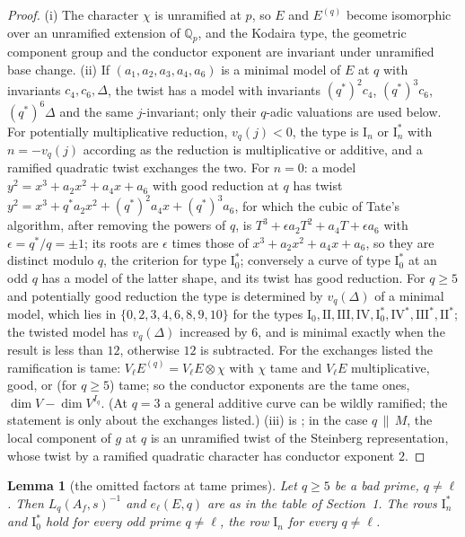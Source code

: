 \documentclass[11pt]{amsart}
\newtheorem{lemma}[theorem]{Lemma}
\theoremstyle{definition}
\newcommand{\Q}{\mathbb{Q}}
\begin{document}
\begin{proof}
(i) The character $\chi$ is unramified at $p$, so $E$ and $E^{(q)}$ become isomorphic over an unramified extension of $\Q_p$, and the Kodaira type, the geometric component group and the conductor exponent are invariant under unramified base change. (ii) If $(a_1,a_2,a_3,a_4,a_6)$ is a minimal model of $E$ at $q$ with invariants $c_4,c_6,\Delta$, the twist has a model with invariants $(q^*)^{2}c_4$, $(q^*)^{3}c_6$, $(q^*)^{6}\Delta$ and the same $j$-invariant; only their $q$-adic valuations are used below. For potentially multiplicative reduction, $v_q(j)<0$, the type is $\mathrm{I}_n$ or $\mathrm{I}_n^*$ with $n=-v_q(j)$ according as the reduction is multiplicative or additive, and a ramified quadratic twist exchanges the two. For $n=0$: a model $y^2=x^3+a_2x^2+a_4x+a_6$ with good reduction at $q$ has twist $y^2=x^3+q^*a_2x^2+(q^*)^2a_4x+(q^*)^3a_6$, for which the cubic of Tate's algorithm, after removing the powers of $q$, is $T^3+\epsilon a_2T^2+a_4T+\epsilon a_6$ with $\epsilon=q^*/q=\pm1$; its roots are $\epsilon$ times those of $x^3+a_2x^2+a_4x+a_6$, so they are distinct modulo $q$, the criterion for type $\mathrm{I}_0^*$; conversely a curve of type $\mathrm{I}_0^*$ at an odd $q$ has a model of the latter shape, and its twist has good reduction. For $q\ge5$ and potentially good reduction the type is determined by $v_q(\Delta)$ of a minimal model, which lies in $\{0,2,3,4,6,8,9,10\}$ for the types $\mathrm{I}_0,\mathrm{II},\mathrm{III},\mathrm{IV},\mathrm{I}_0^*,\mathrm{IV}^*,\mathrm{III}^*,\mathrm{II}^*$; the twisted model has $v_q(\Delta)$ increased by $6$, and is minimal exactly when the result is less than $12$, otherwise $12$ is subtracted. For the exchanges listed the ramification is tame: $V_\ell E^{(q)}=V_\ell E\otimes\chi$ with $\chi$ tame and $V_\ell E$ multiplicative, good, or (for $q\ge5$) tame; so the conductor exponents are the tame ones, $\dim V-\dim V^{I_q}$. (At $q=3$ a general additive curve can be wildly ramified; the statement is only about the exchanges listed.) (iii) is \cite[Theorem 3.1]{AtkinLi78}; in the case $q\,\|\,M$, the local component of $g$ at $q$ is an unramified twist of the Steinberg representation, whose twist by a ramified quadratic character has conductor exponent $2$.
\end{proof}

\begin{lemma}[the omitted factors at tame primes]\label{lem:euler}
Let $q\ge5$ be a bad prime, $q\ne\ell$. Then $L_q(A_f,s)^{-1}$ and $e_\ell(E,q)$ are as in the table of Section~1. The rows $\mathrm{I}_n^*$ and $\mathrm{I}_0^*$ hold for every odd prime $q\ne\ell$, the row $\mathrm{I}_n$ for every $q\ne\ell$.
\end{lemma}
\end{document}

